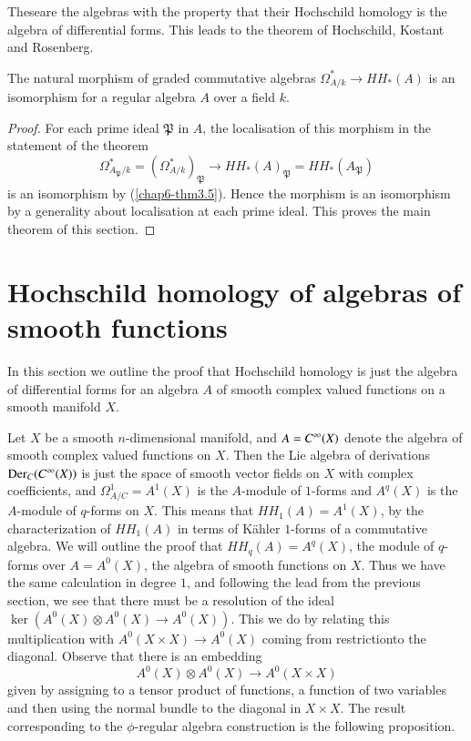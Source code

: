 These\pageoriginale are the algebras with the property that their
Hochschild homology is the algebra of differential forms. This leads
to the theorem of Hochschild, Kostant and Rosenberg.

\begin{theorem}\label{chap6-thm3.8}
The natural morphism of graded commutative algebras
$\Omega^{*}_{A/k}\to HH_{\ast}(A)$ is an isomorphism for a regular
algebra $A$ over a field $k$. 
\end{theorem}

\begin{proof}
For each prime ideal $\mathfrak{P}$ in $A$, the localisation of this
morphism in the statement of the theorem
$$
\Omega^{*}_{A_{\mathfrak{P}}/k}=(\Omega^{*}_{A/k})_{\mathfrak{P}}\to
HH_{\ast}(A)_{\mathfrak{P}}=HH_{\ast}(A_{\mathfrak{P}})
$$
is an isomorphism by (\ref{chap6-thm3.5}). Hence the morphism is an
isomorphism by a generality about localisation at each prime
ideal. This proves the main theorem of this section.
\end{proof}

\section{Hochschild homology of algebras of smooth
  functions}\label{chap6-sec4}

In this section we outline the proof that Hochschild homology is just
the algebra of differential forms for an algebra $A$ of smooth complex
valued functions on a smooth manifold $X$.

\begin{remark}\label{chap6-rem4.1}
Let $X$ be a smooth $n$-dimensional manifold, and $A=\break C^{\infty}(X)$
denote the algebra of smooth complex valued functions on $X$. Then the
Lie algebra of derivations $\operatorname{Der}_{C}(C^{\infty}(X))$ is just the space
of smooth vector fields on $X$ with complex coefficients, and
$\Omega^{1}_{A/C}=A^{1}(X)$ is the $A$-module of $1$-forms and
$A^{q}(X)$ is the $A$-module of $q$-forms on $X$. This means that
$HH_{1}(A)=A^{1}(X)$, by the characterization of $HH_{1}(A)$ in terms
of K\"ahler $1$-forms of a commutative algebra. We will outline the
proof that $HH_{q}(A)=A^{q}(X)$, the module of $q$-forms over
$A=A^{0}(X)$, the algebra of smooth functions on $X$. Thus we have the
same calculation in degree $1$, and following the lead from the
previous section, we see that there must be a resolution of the ideal
$\ker(A^{0}(X)\otimes A^{0}(X)\to A^{0}(X))$. This we do by relating
this multiplication with $A^{0}(X\times X)\to A^{0}(X)$ coming from
restriction\pageoriginale to the diagonal. Observe that there is an
embedding
$$
A^{0}(X)\otimes A^{0}(X)\to A^{0}(X\times X)
$$
given by assigning to a tensor product of functions, a function of two
variables and then using the normal bundle to the diagonal in $X\times
X$. The result corresponding to the $\phi$-regular algebra
construction is the following proposition.
\end{remark}

